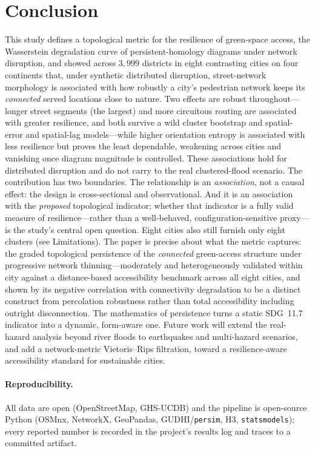 \section{Conclusion}
This study defines a topological metric for the resilience of green-space access, the
Wasserstein degradation curve of persistent-homology diagrams under network
disruption, and showed across $3{,}999$ districts in eight contrasting cities on four
continents that, under synthetic distributed disruption, street-network morphology is
associated with how robustly a city's
pedestrian network keeps its \emph{connected} served locations close to nature. Two
effects are robust throughout---longer street segments (the largest) and more
circuitous routing are associated with greater resilience, and both survive a wild
cluster bootstrap and spatial-error and spatial-lag models---while higher orientation
entropy is associated with less resilience but proves the least dependable, weakening
across cities and vanishing once diagram magnitude is controlled. These associations
hold for distributed disruption and do not carry to the real clustered-flood scenario. The contribution has two boundaries. The relationship
is an \emph{association}, not a causal effect: the design is cross-sectional and
observational. And it is an association with the \emph{proposed} topological
indicator; whether that indicator is a fully valid measure of resilience---rather
than a well-behaved, configuration-sensitive proxy---is the study's central open
question. Eight cities also still furnish only eight clusters (see
Limitations). The paper is precise
about what the metric captures: the graded topological persistence of the
\emph{connected} green-access structure under progressive network thinning---moderately
and heterogeneously validated within city against a distance-based accessibility
benchmark across all eight cities, and shown by its negative correlation with
connectivity degradation to be a distinct construct from percolation robustness rather
than total accessibility including outright disconnection. The mathematics of persistence turns a
static SDG~11.7 indicator into a dynamic, form-aware one. Future work will
extend the real-hazard analysis beyond river floods to earthquakes and multi-hazard
scenarios, and add a network-metric Vietoris--Rips filtration, toward a
resilience-aware accessibility standard for
sustainable cities.

\paragraph{Reproducibility.} All data are open (OpenStreetMap, GHS-UCDB) and the
pipeline is open-source Python (OSMnx, NetworkX, GeoPandas, GUDHI/\texttt{persim},
H3, \texttt{statsmodels}); every reported number is recorded in the project's
results log and traces to a committed artifact.


